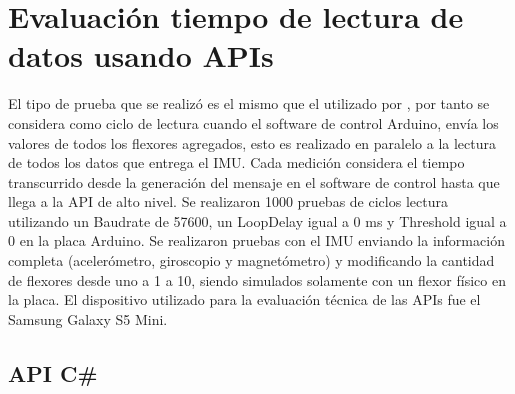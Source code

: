 \section{Evaluación tiempo de lectura de datos usando APIs}
El tipo de prueba que se realizó es el mismo que el utilizado por \cite{tesis-cerda-rodrigo}, por tanto se considera como ciclo de lectura cuando el software de control Arduino, envía los valores de todos los flexores agregados, esto es realizado en paralelo a la lectura de todos los datos que entrega el IMU. Cada medición considera el tiempo transcurrido desde la generación del mensaje en el software de control hasta que llega a la API de alto nivel. Se realizaron 1000 pruebas de ciclos lectura utilizando un Baudrate de 57600, un LoopDelay igual a 0 ms y Threshold igual a 0 en la placa Arduino. Se realizaron pruebas con el IMU enviando la información completa (acelerómetro, giroscopio y magnetómetro) y modificando la cantidad de flexores desde uno a 1 a 10, siendo simulados solamente con un flexor físico en la placa. El dispositivo utilizado para la evaluación técnica de las APIs fue el Samsung Galaxy S5 Mini.

\subsection{API C\#}


